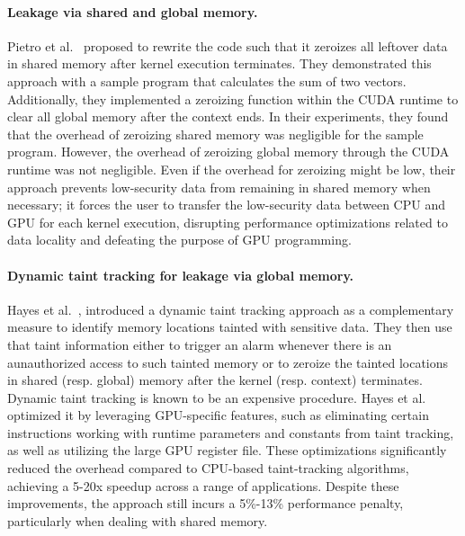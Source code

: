 \paragraph{Leakage via shared and global memory.} Pietro et al.~\cite{pietro2016TECS} proposed to rewrite the code such that it zeroizes all leftover data in shared memory after kernel execution terminates.
%
They demonstrated this approach with a sample program that calculates the sum of two vectors.
%
Additionally, they implemented a zeroizing function within the CUDA runtime to clear all global memory after the context ends.
%
In their experiments, they found that the overhead of zeroizing shared memory was negligible for the sample program.
%
However, the overhead of zeroizing global memory through the CUDA runtime was not negligible.
%
Even if the overhead for zeroizing might be low, their approach prevents low-security data from remaining in shared memory when necessary; it forces the user to transfer the low-security data between CPU and GPU for each kernel execution, disrupting performance optimizations related to data locality and defeating the purpose of GPU programming.
%

%

%

\paragraph{Dynamic taint tracking for leakage via global memory.} Hayes et al.~\cite{hayes2017usenix}, introduced a dynamic taint tracking approach as a complementary measure to identify memory locations tainted with sensitive data.
%
They then use that taint information either to trigger an alarm whenever there is an aunauthorized access to such tainted memory or to zeroize the tainted locations in shared (resp. global) memory after the kernel (resp. context) terminates.
%
Dynamic taint tracking is known to be an expensive procedure. 
%
Hayes et al. optimized it by leveraging GPU-specific features, such as eliminating certain instructions working with runtime parameters and constants from taint tracking, as well as utilizing the large GPU register file.
%
These optimizations significantly reduced the overhead compared to CPU-based taint-tracking algorithms,  achieving a 5-20x speedup across a range of applications.
%
Despite these improvements, the approach still incurs a 5\%-13\% performance penalty, particularly when dealing with shared memory.

